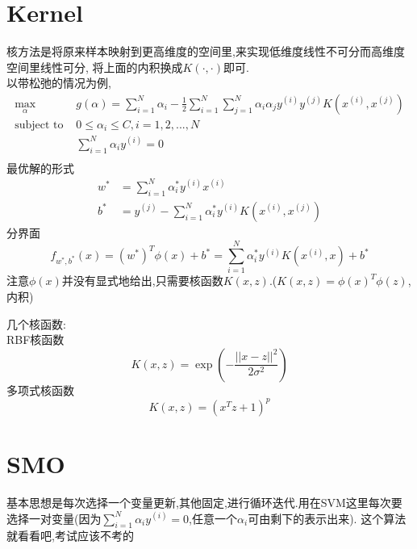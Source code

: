 \documentclass[12pt,letterpaper]{article}
\begin{document}
\section{Kernel}
核方法是将原来样本映射到更高维度的空间里,来实现低维度线性不可分而高维度空间里线性可分, 将上面的内积换成$K(\cdot,\cdot)$即可.\\
以带松弛的情况为例,
\[
	\begin{split} 
	\max_{\alpha} \quad &g(\alpha) =\sum_{i=1}^{N}\alpha_i - \frac{1}{2} \sum_{i=1}^{N}  \sum_{j=1}^N
	\alpha_i\alpha_j y^{(i)}y^{(j)} K(x^{(i)}, x^{(j)})  \\
	\text{subject to }
	& 0 \leq \alpha_i \leq C, i = 1,2,...,N\\
	& \sum_{i=1}^{N} \alpha_iy^{(i)} = 0 \\
	\end{split} 
\]
最优解的形式
\[
	\begin{split} 
	w^* &= \sum_{i=1}^{N} \alpha_i^* y^{(i)}x^{(i)} \\
	b^* &= y^{(j)} - \sum_{i=1}^{N}\alpha_i^* y^{(i)}K(x^{(i)}, x^{(j)}) 
	\end{split} 
\]
分界面
\[
	f_{w^*,b^*}(x) = (w^*)^T\phi(x) + b^* 
	= \sum_{i=1}^{N} \alpha_i^* y^{(i)} K(x^{(i)}, x) + b^*
\]
注意$\phi(x)$并没有显式地给出,只需要核函数$K(x,z)$.($K(x,z) = \phi(x)^T\phi(z)$, 内积)

几个核函数:\\
RBF核函数
\[
	K(x,z) = \exp\left( -\frac{||x-z||^2}{2\sigma^2} \right)
\]
多项式核函数
\[
	K(x,z) = (x^Tz + 1)^p
\]

\section{SMO}
基本思想是每次选择一个变量更新,其他固定,进行循环迭代.用在SVM这里每次要选择一对变量(因为$\sum_{i=1}^{N}\alpha_iy^{(i)}=0$,任意一个$\alpha_i$可由剩下的表示出来).
这个算法就看看吧,考试应该不考的


	
\end{document}
